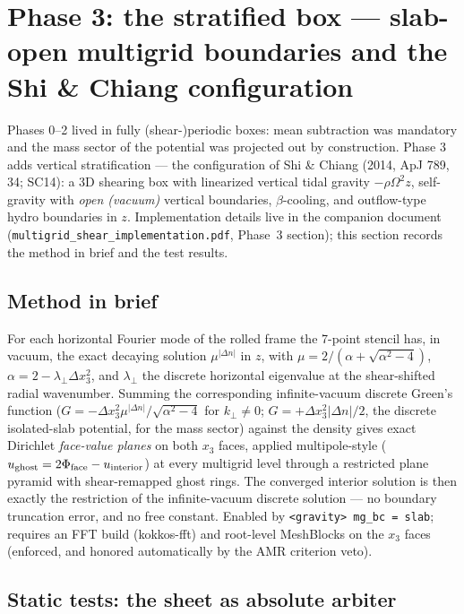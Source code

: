 \documentclass[11pt]{article}
\newcommand{\code}[1]{\texttt{#1}}
\newcommand{\file}[1]{\texttt{#1}}
\newcommand{\Om}{\Omega}
\begin{document}
\section{Phase 3: the stratified box --- slab-open multigrid boundaries and the
Shi \& Chiang configuration}
\label{sec:phase3}

Phases 0--2 lived in fully (shear-)periodic boxes: mean subtraction was mandatory
and the mass sector of the potential was projected out by construction. Phase 3
adds vertical stratification --- the configuration of Shi \& Chiang (2014, ApJ 789,
34; SC14): a 3D shearing box with linearized vertical tidal gravity
$-\rho\Om^2 z$, self-gravity with \emph{open (vacuum)} vertical boundaries,
$\beta$-cooling, and outflow-type hydro boundaries in $z$. Implementation details
live in the companion document (\file{multigrid\_shear\_implementation.pdf},
Phase~3 section); this section records the method in brief and the test results.

\subsection{Method in brief}

For each horizontal Fourier mode of the rolled frame the 7-point stencil has, in
vacuum, the exact decaying solution $\mu^{|\Delta n|}$ in $z$, with
$\mu = 2/(\alpha+\sqrt{\alpha^2-4})$, $\alpha = 2-\lambda_\perp\Delta x_3^2$, and
$\lambda_\perp$ the discrete horizontal eigenvalue at the shear-shifted radial
wavenumber. Summing the corresponding infinite-vacuum discrete Green's function
($G = -\Delta x_3^2\mu^{|\Delta n|}/\sqrt{\alpha^2-4}$ for $k_\perp\neq 0$;
$G = +\Delta x_3^2|\Delta n|/2$, the discrete isolated-slab potential, for the
mass sector) against the density gives exact Dirichlet \emph{face-value planes}
on both $x_3$ faces, applied multipole-style
($u_{\rm ghost} = 2\Phi_{\rm face} - u_{\rm interior}$) at every multigrid level
through a restricted plane pyramid with shear-remapped ghost rings. The converged
interior solution is then exactly the restriction of the infinite-vacuum discrete
solution --- no boundary truncation error, and no free constant. Enabled by
\code{<gravity> mg\_bc = slab}; requires an FFT build (kokkos-fft) and root-level
MeshBlocks on the $x_3$ faces (enforced, and honored automatically by the AMR
criterion veto).

\subsection{Static tests: the sheet as absolute arbiter}
\end{document}
